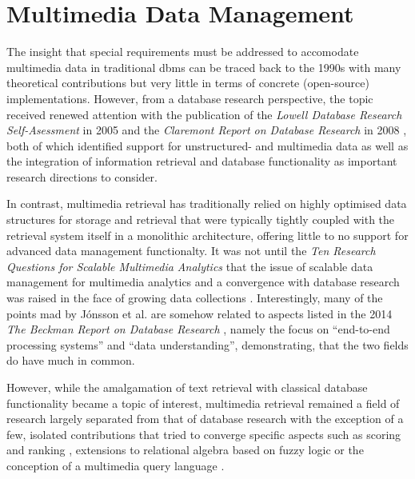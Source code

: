 \chapter{Multimedia Data Management}
\label{chapter:theory_multimedia_database}

The insight that special requirements must be addressed to accomodate multimedia data in traditional \acrshort{dbms} can be traced back to the 1990s \cite{Marcus:1996Foundations,Adjeroh:1997Multimedia} with many theoretical contributions but very little in terms of concrete (open-source) implementations. However, from a database research perspective, the topic received renewed attention with the publication of the \emph{Lowell Database Research Self-Asessment} in 2005 \cite{Abiteboul:2005Lowell} and the \emph{Claremont Report on Database Research} in 2008 \cite{Agrawal:2008Claremont}, both of which identified support for unstructured- and multimedia data as well as the integration of information retrieval and database functionality as important research directions to consider.

In contrast, multimedia retrieval has traditionally relied on highly optimised data structures for storage and retrieval that were typically tightly coupled with the retrieval system itself in a monolithic architecture, offering little to no support for advanced data management functionalty. It was not until the \emph{Ten Research Questions for Scalable Multimedia Analytics} \cite{Jonson:2016Ten} that the issue of scalable data management for multimedia analytics and a convergence with database research was raised in the face of growing data collections \cite{Berns:2019V3C1,Rossetto:2021Insights}. Interestingly, many of the points mad by Jónsson et al. are somehow related to aspects listed in the 2014 \emph{The Beckman Report on Database Research} \cite{Abadi:2014Beckman}, namely the focus on ``end-to-end processing systems'' and ``data understanding'', demonstrating, that the two fields do have much in common.

However, while the amalgamation of text retrieval with classical database functionality became a topic of interest, multimedia retrieval remained a field of research largely separated from that of database research with the exception of a few, isolated contributions that tried to converge specific aspects such as scoring and ranking \cite{Chengkai:2005RankSQL,Zhang:2006Boolean}, extensions to relational algebra based on fuzzy logic \cite{Montesi:1999Similarity} or the conception of a multimedia query language \cite{Budikova:2012Query}.

